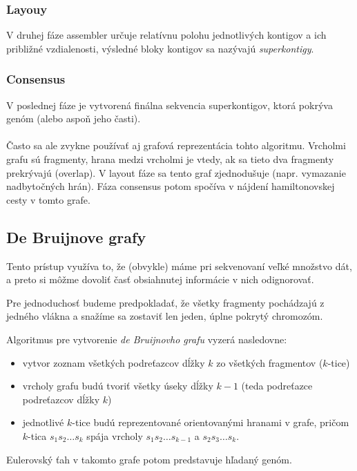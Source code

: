     \subsubsection{Layouy}
V druhej fáze assembler určuje relatívnu polohu jednotlivých kontigov a ich približné vzdialenosti, výsledné bloky kontigov sa nazývajú \emph{superkontigy}.

    \subsubsection{Consensus}
V poslednej fáze je vytvorená finálna sekvencia superkontigov, ktorá pokrýva genóm (alebo aspoň jeho časti). 
\\ \\
Často sa ale zvykne používať aj grafová reprezentácia tohto algoritmu. Vrcholmi grafu sú fragmenty, hrana medzi vrcholmi je vtedy, ak sa tieto dva fragmenty prekrývajú (overlap). V layout fáze sa tento graf zjednodušuje (napr. vymazanie nadbytočných hrán). Fáza consensus potom spočíva v nájdení hamiltonovskej cesty v tomto grafe.
    
    \subsection{De Bruijnove grafy}
    Tento prístup využíva to, že (obvykle) máme pri sekvenovaní veľké množstvo
    dát, a preto si môžme dovoliť časť obsiahnutej informácie v nich
    odignorovať.
    
    Pre jednoduchosť budeme predpokladať, že všetky fragmenty pochádzajú z
    jedného vlákna a snažíme sa zostaviť len jeden, úplne pokrytý chromozóm.

    Algoritmus pre vytvorenie \emph{de Bruijnovho grafu} vyzerá nasledovne:
    
    \begin{itemize}
        \item vytvor zoznam všetkých podreťazcov dĺžky $k$ zo všetkých
        fragmentov ($k$-tice)
        \item vrcholy grafu budú tvoriť všetky úseky dĺžky $k - 1$ (teda
        podreťazce podreťazcov dĺžky $k$)
        \item jednotlivé $k$-tice budú reprezentované orientovanými hranami v
        grafe, pričom $k$-tica $s_1 s_2 \ldots s_k$ spája vrcholy $s_1 s_2
        \ldots s_{k-1}$ a $s_2 s_3 \ldots s_k$. 
    \end{itemize}
    
    Eulerovský ťah v takomto grafe potom predstavuje hľadaný genóm.
    
